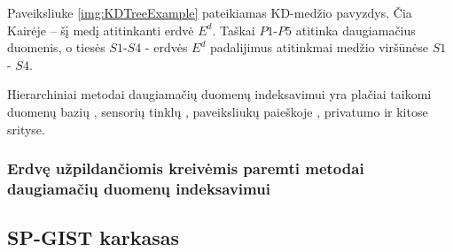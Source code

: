 Paveiksliuke \ref{img:KDTreeExample} pateikiamas KD-medžio pavyzdys.
Čia Kairėje -- šį medį atitinkanti erdvė $E^d$.
Taškai $P1$-$P5$ atitinka daugiamačius duomenis, o tiesės $S1$-$S4$ - erdvės $E^d$ padalijimus atitinkmai medžio viršūnėse $S1$ - $S4$.

Hierarchiniai metodai daugiamačių duomenų indeksavimui yra plačiai taikomi duomenų bazių \cite{bohm2001searching}, sensorių tinklų \cite{li2003multi}, paveiksliukų paieškoje \cite{silpa2008optimised}, privatumo \cite{hore2012secure} \cite{xiao2010differentially} ir kitose srityse.

\subsubsection{Erdvę užpildančiomis kreivėmis paremti metodai daugiamačių duomenų indeksavimui}


\subsection{SP-GIST karkasas}
